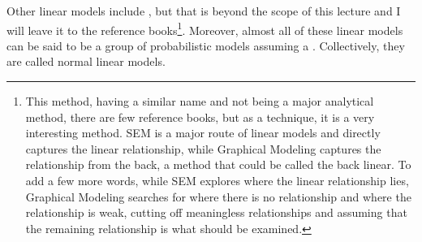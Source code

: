 \documentclass{ltjsbook}
\begin{document}
Other linear models include \parencite{Miyagawa1997}, but that is beyond the scope of this lecture and I will leave it to the reference books\footnote{This method, having a similar name and not being a major analytical method, there are few reference books, but as a technique, it is a very interesting method. SEM is a major route of linear models and directly captures the linear relationship, while Graphical Modeling captures the relationship from the back, a method that could be called the back linear. To add a few more words, while SEM explores where the linear relationship lies, Graphical Modeling searches for where there is no relationship and where the relationship is weak, cutting off meaningless relationships and assuming that the remaining relationship is what should be examined.}. Moreover, almost all of these linear models can be said to be a group of probabilistic models assuming a . Collectively, they are called normal linear models.
\end{document}
